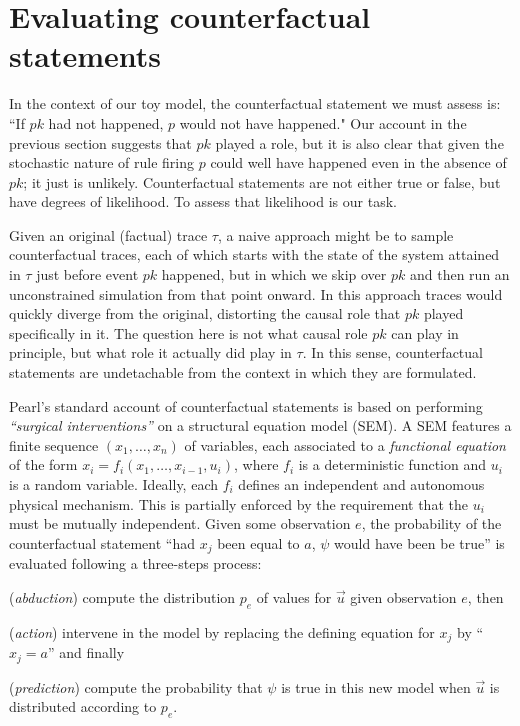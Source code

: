 
\newcommand{\PCFST}[0]{\ProbParen{\CFST{}}}

\newcommand{\ItAbduction}[0]{(\textit{abduction})}
\newcommand{\ItAction}[0]{(\textit{action})}
\newcommand{\ItPrediction}[0]{(\textit{prediction})}


\section{Evaluating counterfactual
  statements}\label{sec:counterfactual}

In the context of our toy model, the counterfactual statement we must
assess is: ``If $pk$ had not happened, $p$ would not have happened."
Our account in the previous section suggests that $pk$ played a role,
but it is also clear that given the stochastic nature of rule firing
$p$ could well have happened even in the absence of $pk$; it just is
unlikely. Counterfactual statements are not either true or false, but
have degrees of likelihood. To assess that likelihood is our task.

Given an original (factual) trace $\tau$, a naive approach might be to
sample counterfactual traces, each of which starts with the state of
the system attained in $\tau$ just before event $pk$ happened, but in
which we skip over $pk$ and then run an unconstrained simulation from
that point onward. In this approach traces would quickly diverge from
the original, distorting the causal role that $pk$ played
specifically in it. The question here is not what causal role
$pk$ can play in principle, but what role it actually
did play in $\tau$. In this sense, counterfactual statements
are undetachable from the context in which they are formulated.

Pearl's standard account of counterfactual statements
\cite{pearl2009causality} is based on performing \textit{``surgical
  interventions''} on a structural equation model (SEM). A SEM
features a finite sequence $(x_1, \dots, x_n)$ of variables, each
associated to a \emph{functional equation} of the form
$x_i = f_i(x_1, \dots, x_{i-1}, u_i)$, where $f_i$ is a deterministic
function and $u_i$ is a random variable. Ideally, each $f_i$ defines
an independent and autonomous physical mechanism. This is partially
enforced by the requirement that the $u_i$ must be mutually
independent. Given some observation $e$,
the probability of the counterfactual statement ``had $x_j$ been equal
to $a$, $\psi$ would have been be true'' is evaluated following a
three-steps process:
\begin{inparaenum}[]
\item \ItAbduction{} compute the distribution $p_e$ of values
  for $\vec u$ given observation $e$, then
\item \ItAction{} intervene in the model by replacing the defining
  equation for $x_j$ by ``$x_j = a$'' and finally
\item \ItPrediction{} compute the probability that $\psi$ is true in
  this new model when $\vec{u}$ is distributed according to $p_e$.
\end{inparaenum}

